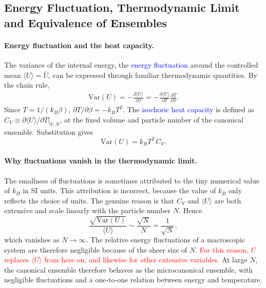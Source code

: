 \subsection{Energy Fluctuation, Thermodynamic Limit and Equivalence of Ensembles}

\paragraph{Energy fluctuation and the heat capacity.}
The variance of the internal energy, the \textcolor{blue}{energy
fluctuation} around the controlled mean $\langle U\rangle=\bar U$, can be
expressed through familiar thermodynamic quantities. By the chain rule,
\begin{align*}
    \mathrm{Var}(U)
    = -\frac{\partial\langle U\rangle}{\partial\beta}
    = -\frac{\partial\langle U\rangle}{\partial T}\frac{\partial T}{\partial\beta}.
\end{align*}
Since $T=1/(k_B\beta)$, $\partial T/\partial\beta=-k_BT^2$. The
\textcolor{blue}{isochoric heat capacity} is defined as
$C_V\equiv\left.\partial\langle U\rangle/\partial T\right|_{V,N}$, at the
fixed volume and particle number of the canonical ensemble. Substitution
gives
\begin{equation}
    \boxed{\mathrm{Var}(U) = k_B T^2\, C_V.}
\end{equation}

\paragraph{Why fluctuations vanish in the thermodynamic limit.}
The smallness of fluctuations is sometimes attributed to the tiny numerical
value of $k_B$ in SI units. This attribution is incorrect, because the value
of $k_B$ only reflects the choice of units. The genuine reason is that $C_V$
and $\langle U\rangle$ are both extensive and scale linearly with the
particle number $N$. Hence
\begin{equation}
    \boxed{\frac{\sqrt{\mathrm{Var}(U)}}{\langle U\rangle}
    \sim\frac{\sqrt{N}}{N}=\frac{1}{\sqrt{N}},}
\end{equation}
which vanishes as $N\to\infty$. The relative energy fluctuations of a
macroscopic system are therefore negligible because of the sheer size of
$N$. \textcolor{red}{For this reason, $U$ replaces $\langle U\rangle$ from
here on, and likewise for other extensive variables.}
At large $N$, the canonical ensemble therefore behaves as the microcanonical
ensemble, with negligible fluctuations and a one-to-one relation between
energy and temperature.

